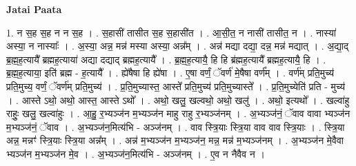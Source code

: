 \documentclass[17pt]{extarticle}
\begin{document}
\textbf{Jatai Paata} \newline

1. न स॒ह स॒ह न न स॒ह । . स॒हासी॑ तासीत स॒ह स॒हासी॑त । . आ॒सी॒त॒ न नासी॑ तासीत॒ न । . नास्या॑ अस्या॒ न नास्याः᳚ । . अ॒स्या॒ अन्न॒ मन्न॑ मस्या अस्या॒ अन्न᳚म् । . अन्न॑ मद्या दद्या॒ दन्न॒ मन्न॑ मद्यात् । . अ॒द्या॒द् ब्र॒ह्म॒ह॒त्यायै᳚ ब्रह्मह॒त्याया॑ अद्या दद्याद् ब्रह्मह॒त्यायै᳚ । . ब्र॒ह्म॒ह॒त्यायै॒ हि हि ब्र॑ह्मह॒त्यायै᳚ ब्रह्मह॒त्यायै॒ हि । . ब्र॒ह्म॒ह॒त्याया॒ इति॑ ब्रह्म - ह॒त्यायै᳚ । . ह्ये॑षैषा हि ह्ये॑षा । . ए॒षा वर्णं॒ ॅवर्ण॑ मे॒षैषा वर्ण᳚म् । . वर्ण॑म् प्रति॒मुच्य॑ प्रति॒मुच्य॒ वर्णं॒ ॅवर्ण॑म् प्रति॒मुच्य॑ । . प्र॒ति॒मुच्यास्त॒ आस्ते᳚ प्रति॒मुच्य॑ प्रति॒मुच्यास्ते᳚ । . प्र॒ति॒मुच्येति॑ प्रति - मुच्य॑ । . आस्ते ऽथो॒ अथो॒ आस्त॒ आस्ते ऽथो᳚ । . अथो॒ खलु॒ खल्वथो॒ अथो॒ खलु॑ । . अथो॒ इत्यथो᳚ । . खल्वा॑हु राहुः॒ खलु॒ खल्वा॑हुः । . आ॒हु॒ र॒भ्यञ्ज॑न म॒भ्यञ्ज॑न माहु राहु र॒भ्यञ्ज॑नम् । . अ॒भ्यञ्ज॑नं॒ ॅवाव वावा भ्यञ्ज॑न म॒भ्यञ्ज॑नं॒ ॅवाव । . अ॒भ्यञ्ज॑न॒मित्य॑भि - अञ्ज॑नम् । . वाव स्त्रि॒याः स्त्रि॒या वाव वाव स्त्रि॒याः । . स्त्रि॒या अन्न॒ मन्नꣳ॑ स्त्रि॒याः स्त्रि॒या अन्न᳚म् । . अन्न॑ म॒भ्यञ्ज॑न म॒भ्यञ्ज॑न॒ मन्न॒ मन्न॑ म॒भ्यञ्ज॑नम् । . अ॒भ्यञ्ज॑न मे॒वैवा भ्यञ्ज॑न म॒भ्यञ्ज॑न मे॒व । . अ॒भ्यञ्ज॑न॒मित्य॑भि - अञ्ज॑नम् । . ए॒व न नैवैव न । \newline
\end{document}
